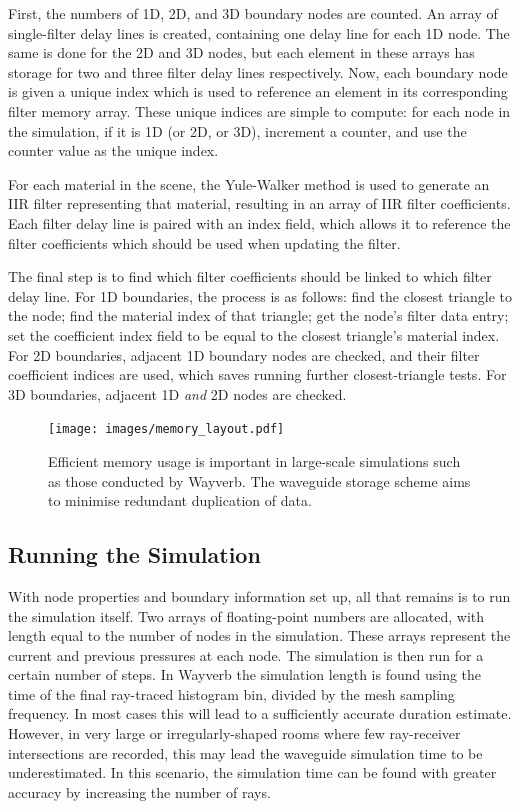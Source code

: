 \documentclass[]{scrreprt}
\begin{document}
First, the numbers of 1D, 2D, and 3D boundary nodes are counted. An
array of single-filter delay lines is created, containing one delay line
for each 1D node. The same is done for the 2D and 3D nodes, but each
element in these arrays has storage for two and three filter delay lines
respectively. Now, each boundary node is given a unique index which is
used to reference an element in its corresponding filter memory array.
These unique indices are simple to compute: for each node in the
simulation, if it is 1D (or 2D, or 3D), increment a counter, and use the
counter value as the unique index.

For each material in the scene, the Yule-Walker method is used to
generate an IIR filter representing that material, resulting in an array
of IIR filter coefficients. Each filter delay line is paired with an
index field, which allows it to reference the filter coefficients which
should be used when updating the filter.

The final step is to find which filter coefficients should be linked to
which filter delay line. For 1D boundaries, the process is as follows:
find the closest triangle to the node; find the material index of that
triangle; get the node's filter data entry; set the coefficient index
field to be equal to the closest triangle's material index. For 2D
boundaries, adjacent 1D boundary nodes are checked, and their filter
coefficient indices are used, which saves running further
closest-triangle tests. For 3D boundaries, adjacent 1D \emph{and} 2D
nodes are checked.

\begin{figure}[htbp]
\centering
\texttt{[image: images/memory\_layout.pdf]}
\caption{Efficient memory usage is important in large-scale simulations
such as those conducted by Wayverb. The waveguide storage scheme aims to
minimise redundant duplication of data.\label{fig:memory_layout}}
\end{figure}

\subsection{Running the Simulation}\label{running-the-simulation}

With node properties and boundary information set up, all that remains
is to run the simulation itself. Two arrays of floating-point numbers
are allocated, with length equal to the number of nodes in the
simulation. These arrays represent the current and previous pressures at
each node. The simulation is then run for a certain number of steps. In
Wayverb the simulation length is found using the time of the final
ray-traced histogram bin, divided by the mesh sampling frequency. In
most cases this will lead to a sufficiently accurate duration estimate.
However, in very large or irregularly-shaped rooms where few
ray-receiver intersections are recorded, this may lead the waveguide
simulation time to be underestimated. In this scenario, the simulation
time can be found with greater accuracy by increasing the number of
rays.
\end{document}

